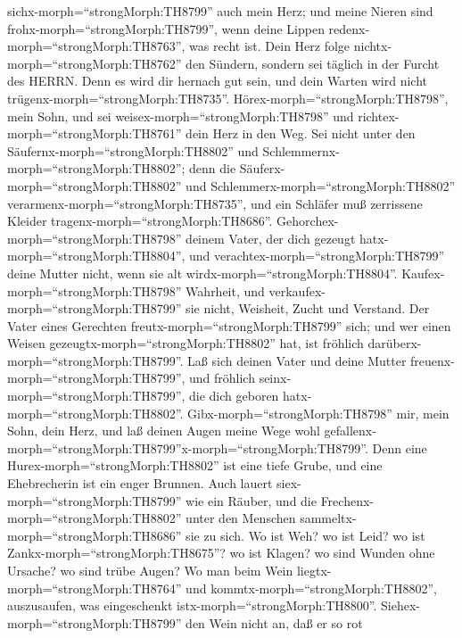 sichx-morph=``strongMorph:TH8799'' auch mein Herz;  und
meine Nieren sind frohx-morph=``strongMorph:TH8799'', wenn deine Lippen
redenx-morph=``strongMorph:TH8763'', was recht ist.  Dein
Herz folge nichtx-morph=``strongMorph:TH8762'' den Sündern, sondern sei
täglich in der Furcht des HERRN.  Denn es wird dir hernach
gut sein, und dein Warten wird nicht
trügenx-morph=``strongMorph:TH8735''. 
Hörex-morph=``strongMorph:TH8798'', mein Sohn, und sei
weisex-morph=``strongMorph:TH8798'' und
richtex-morph=``strongMorph:TH8761'' dein Herz in den Weg. 
Sei nicht unter den Säufernx-morph=``strongMorph:TH8802'' und
Schlemmernx-morph=``strongMorph:TH8802'';  denn die
Säuferx-morph=``strongMorph:TH8802'' und
Schlemmerx-morph=``strongMorph:TH8802''
verarmenx-morph=``strongMorph:TH8735'', und ein Schläfer muß zerrissene
Kleider tragenx-morph=``strongMorph:TH8686''. 
Gehorchex-morph=``strongMorph:TH8798'' deinem Vater, der dich gezeugt
hatx-morph=``strongMorph:TH8804'', und
verachtex-morph=``strongMorph:TH8799'' deine Mutter nicht, wenn sie alt
wirdx-morph=``strongMorph:TH8804''. 
Kaufex-morph=``strongMorph:TH8798'' Wahrheit, und
verkaufex-morph=``strongMorph:TH8799'' sie nicht, Weisheit, Zucht und
Verstand.  Der Vater eines Gerechten
freutx-morph=``strongMorph:TH8799'' sich; und wer einen Weisen
gezeugtx-morph=``strongMorph:TH8802'' hat, ist fröhlich
darüberx-morph=``strongMorph:TH8799''.  Laß sich deinen
Vater und deine Mutter freuenx-morph=``strongMorph:TH8799'', und
fröhlich seinx-morph=``strongMorph:TH8799'', die dich geboren
hatx-morph=``strongMorph:TH8802''. 
Gibx-morph=``strongMorph:TH8798'' mir, mein Sohn, dein Herz, und laß
deinen Augen meine Wege wohl
gefallenx-morph=``strongMorph:TH8799''x-morph=``strongMorph:TH8799''.
 Denn eine Hurex-morph=``strongMorph:TH8802'' ist eine
tiefe Grube, und eine Ehebrecherin ist ein enger Brunnen. 
Auch lauert siex-morph=``strongMorph:TH8799'' wie ein Räuber, und die
Frechenx-morph=``strongMorph:TH8802'' unter den Menschen
sammeltx-morph=``strongMorph:TH8686'' sie zu sich.  Wo ist
Weh? wo ist Leid? wo ist Zankx-morph=``strongMorph:TH8675''? wo ist
Klagen? wo sind Wunden ohne Ursache? wo sind trübe Augen? 
Wo man beim Wein liegtx-morph=``strongMorph:TH8764'' und
kommtx-morph=``strongMorph:TH8802'', auszusaufen, was eingeschenkt
istx-morph=``strongMorph:TH8800''. 
Siehex-morph=``strongMorph:TH8799'' den Wein nicht an, daß er so rot
